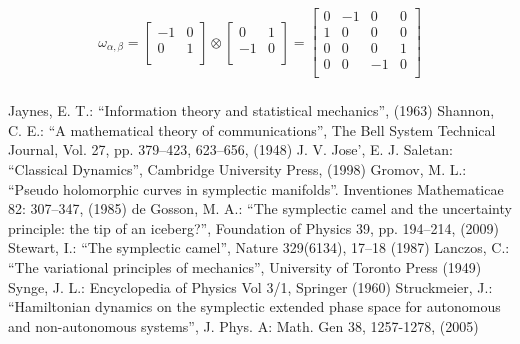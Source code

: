 \documentclass[aps,pra,10pt,twocolumn,floatfix,nofootinbib]{revtex4-1}
\theoremstyle{definition}
\begin{document}
\begin{align*}
\omega_{\alpha, \beta} =  \left[
  \begin{array}{cc}
    -1 & 0 \\
    0 & 1 \\
  \end{array}
\right] \otimes \left[
  \begin{array}{cc}
    0 & 1 \\
    -1 & 0 \\
  \end{array}
\right]
= \left[
  \begin{array}{cccc}
    0 & -1 & 0 & 0 \\
    1 & 0 & 0 & 0 \\
    0 & 0 & 0 & 1 \\
    0 & 0 & -1 & 0 \\
  \end{array}
\right] \\
\end{align*}


\begin{thebibliography}{0}

 Jaynes, E. T.: ``Information theory and statistical mechanics'', (1963)
 Shannon, C. E.: ``A mathematical theory of communications'', The Bell System Technical Journal, Vol. 27, pp. 379–423, 623–656, (1948)
 J. V. Jose', E. J. Saletan: ``Classical Dynamics'', Cambridge University Press, (1998)
 Gromov, M. L.: ``Pseudo holomorphic curves in symplectic manifolds''. Inventiones Mathematicae 82: 307–347, (1985)
 de Gosson, M. A.: ``The symplectic camel and the uncertainty principle: the tip of an iceberg?'', Foundation of Physics 39, pp. 194–214, (2009)
 Stewart, I.: ``The symplectic camel'', Nature 329(6134), 17–18 (1987)
 Lanczos, C.: ``The variational principles of mechanics'', University of Toronto Press (1949)
 Synge, J. L.: Encyclopedia of Physics Vol 3/1, Springer (1960)
 Struckmeier, J.: ``Hamiltonian dynamics on the symplectic extended phase space for autonomous and non-autonomous systems'', J. Phys. A: Math. Gen 38, 1257-1278, (2005)

\end{thebibliography}
\end{document}
